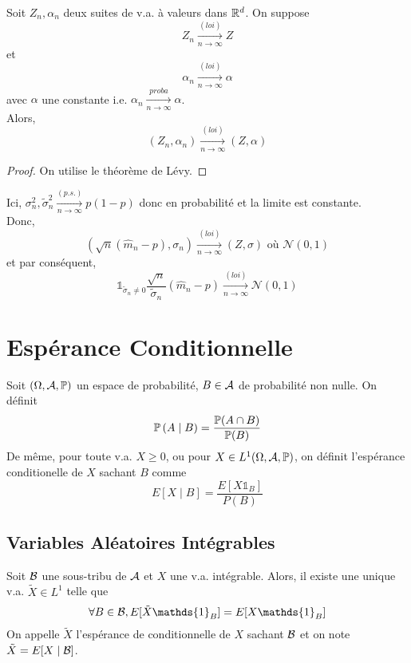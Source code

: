 \documentclass{cours}
\begin{document}
\begin{itemize}
          \begin{lemma}
              Soit $Z_{n}, \alpha_{n}$ deux suites de v.a. à valeurs dans $\R^{d}$. On suppose \[Z_{n} \xrightarrow[n \to\infty]{(loi)} Z\] et \[\alpha_{n} \xrightarrow[n \to \infty]{(loi)} \alpha\] avec $\alpha$ une constante i.e. $\alpha_{n} \xrightarrow[n \to \infty]{proba} \alpha$. \\
              Alors, \[\left(Z_{n}, \alpha_{n}\right) \xrightarrow[n \to \infty]{(loi)}\left(Z, \alpha\right)\]
          \end{lemma}
          \begin{proof}
              On utilise le théorème de Lévy.
          \end{proof}
          Ici, $\sigma_{n}^{2}, \tilde{\sigma}_{n}^{2} \xrightarrow[n \to \infty]{(p.s.)} p(1-p)$ donc en probabilité et la limite est constante. \\
          Donc,
          \[
              \left(\sqrt{n}\left(\hat{m}_{n} - p\right), \sigma_{n}\right) \xrightarrow[n \to \infty]{(loi)} \left(Z, \sigma\right) \text{ où } \mathcal{N}(0, 1)
          \]
          et par conséquent,
          \[
              \mathds{1}_{\tilde{\sigma}_{n} \neq 0} \frac{\sqrt{n}}{\tilde{\sigma}_{n}}\left(\hat{m}_{n} - p\right) \xrightarrow[n \to \infty]{(loi)} \mathcal{N}(0, 1)
          \]
\end{itemize}

\section{Espérance Conditionnelle}
\begin{definition}
    Soit $\left(\Omega, \A, \mathbb{P}\right)$ un espace de probabilité, $B \in \A$ de probabilité non nulle. On définit
    \[
        \P\left(A \mid B\right) = \frac{\mathbb{P}(A \cap B)}{\P(B)}
    \]
    De même, pour toute v.a. $X \geq 0$, ou pour $X \in L^{1}(\Omega, \A, \P)$, on définit l'espérance conditionelle de $X$ sachant $B$ comme
    \[
        E\left[X \mid B\right] = \frac{E[X\mathds{1}_{B}]}{P(B)}
    \]
\end{definition}

\subsection{Variables Aléatoires Intégrables}
\begin{definition}
    Soit $\B$ une sous-tribu de $\A$ et $X$ une v.a. intégrable. Alors, il existe une unique v.a. $\tilde{X} \in L^{1}$ telle que
    \[
        \forall B \in \B, E[\tilde{X}\mathds{1}_{B}] = E[X\mathds{1}_{B}]
    \]
    On appelle $\tilde{X}$ l'espérance de conditionnelle de $X$ sachant $\B$ et on note $\tilde{X} = E[X \mid \B]$.\\
\end{definition}
\end{document}
